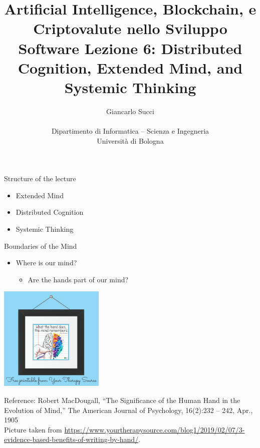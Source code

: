 \documentclass{beamer}
\title[L04]{Artificial Intelligence, Blockchain, e Criptovalute nello Sviluppo Software \newline\newline
Lezione 6: Distributed Cognition, Extended Mind, and Systemic Thinking} %
\author[{\tiny Giancarlo Succi }]{Giancarlo Succi\\\\ Dipartimento di Informatica -- Scienza e Ingegneria\\Universit\`{a} di Bologna\\
\bftt{g.succi@unibo.it}
} %
\institute[unibo] %
\date{} %
\begin{document}
\begin{frame}
\titlepage %

\end{frame}





\begin{frame}
{\centerline{Structure of the lecture}}
\begin{itemize}
    \item Extended Mind
    \item Distributed Cognition
    \item Systemic Thinking
    \end{itemize}
\end{frame}

\begin{frame}
{\centerline{Boundaries of the Mind}}

\begin{center}
\begin{itemize}
    \item Where is our mind?
    \begin{itemize}
    \item Are the hands part of our mind?
\end{itemize} 
\end{itemize} 

 \includegraphics[width=5cm]{P2023.AIBCCSS.ExtendedMindDistributedCognitionSystemicThinking/what-the-hand-does-the-mind-remembers.jpg}
 
 \end{center}

\begin{center}
\tiny
Reference: Robert MacDougall, ``The Significance of the Human Hand in the Evolution of Mind,'' The American Journal of Psychology, 16(2):232 -- 242, Apr., 1905\\Picture taken from \url{https://www.yourtherapysource.com/blog1/2019/02/07/3-evidence-based-benefits-of-writing-by-hand/}.
\end{center}
\end{frame}
\end{document}
